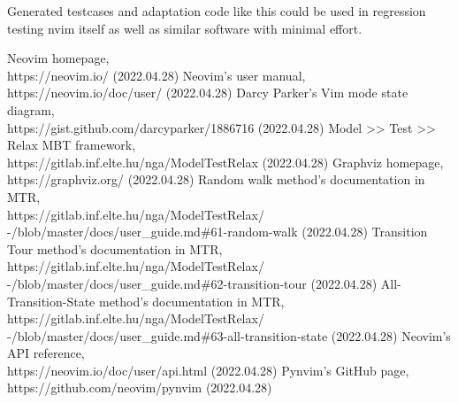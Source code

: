 \documentclass[12pt]{article}
\begin{document}
	Generated testcases and adaptation code like this could be used in regression testing nvim itself as well as similar software with minimal effort.

	\newpage


\begin{thebibliography}{1}
	 Neovim homepage,\\https://neovim.io/ (2022.04.28)
	 Neovim's user manual,\\https://neovim.io/doc/user/ (2022.04.28)
	 Darcy Parker's Vim mode state diagram,\\https://gist.github.com/darcyparker/1886716 (2022.04.28)
	 Model >> Test >> Relax MBT framework,\\https://gitlab.inf.elte.hu/nga/ModelTestRelax (2022.04.28)
	 Graphviz homepage,\\https://graphviz.org/ (2022.04.28)
	 Random walk method's documentation in MTR,\\https://gitlab.inf.elte.hu/nga/ModelTestRelax/\\-/blob/master/docs/user\_guide.md\#61-random-walk (2022.04.28)
	 Transition Tour method's documentation in MTR,\\https://gitlab.inf.elte.hu/nga/ModelTestRelax/\\-/blob/master/docs/user\_guide.md\#62-transition-tour (2022.04.28)
	 All-Transition-State method's documentation in MTR,\\https://gitlab.inf.elte.hu/nga/ModelTestRelax/\\-/blob/master/docs/user\_guide.md\#63-all-transition-state (2022.04.28)
	 Neovim's API reference,\\https://neovim.io/doc/user/api.html (2022.04.28)
	 Pynvim's GitHub page,\\https://github.com/neovim/pynvim (2022.04.28)
\end{thebibliography}
\end{document}

